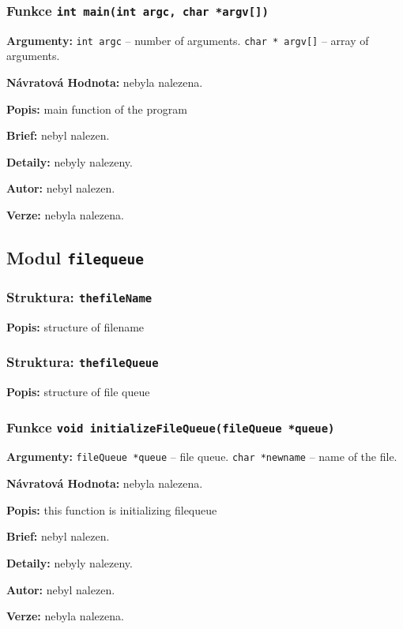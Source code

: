 \documentclass[12pt, a4paper]{article}
\begin{document}
\subsubsection{Funkce \texttt{int main(int argc, char *argv[])}}
\textbf{Argumenty: }\verb"int argc" -- number of arguments. \verb"char * argv[]" -- array of arguments. \\
\par\noindent
\textbf{Návratová Hodnota: }nebyla nalezena.\\
\par\noindent
\textbf{Popis: }main function of the program\\
\par\noindent
\textbf{Brief: }nebyl nalezen.\\
\par\noindent
\textbf{Detaily: }nebyly nalezeny.\\
\par\noindent
\textbf{Autor: }nebyl nalezen.\\
\par\noindent
\textbf{Verze: }nebyla nalezena.\\
\par\noindent
\subsection{Modul \texttt{filequeue}}
\subsubsection{Struktura: \texttt{thefileName}}
\textbf{Popis: }structure of filename\\
\par\noindent
\subsubsection{Struktura: \texttt{thefileQueue}}
\textbf{Popis: }structure of file queue\\
\par\noindent
\subsubsection{Funkce \texttt{void initializeFileQueue(fileQueue *queue)}}
\textbf{Argumenty: }\verb"fileQueue *queue" -- file queue. \verb"char *newname" -- name of the file. \\
\par\noindent
\textbf{Návratová Hodnota: }nebyla nalezena.\\
\par\noindent
\textbf{Popis: }this function is initializing filequeue\\
\par\noindent
\textbf{Brief: }nebyl nalezen.\\
\par\noindent
\textbf{Detaily: }nebyly nalezeny.\\
\par\noindent
\textbf{Autor: }nebyl nalezen.\\
\par\noindent
\textbf{Verze: }nebyla nalezena.\\
\par\noindent
\end{document}
